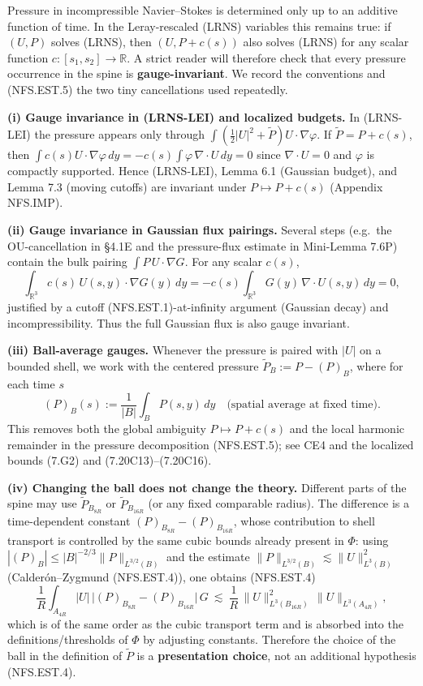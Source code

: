 \documentclass[
  11pt,
]{article}
\begin{document}
Pressure in incompressible Navier--Stokes is determined only up to an additive function of time. In the Leray-rescaled (LRNS) variables this remains true: if \((U,P)\) solves (LRNS), then \((U,P+c(s))\) also solves (LRNS) for any scalar function \(c\colon[s_1,s_2]\to\mathbb R\). A strict reader will therefore check that every pressure occurrence in the spine is \textbf{gauge-invariant}. We record the conventions and (NFS.EST.5) the two tiny cancellations used repeatedly.

\textbf{(i) Gauge invariance in (LRNS-LEI) and localized budgets.} In (LRNS-LEI) the pressure appears only through \(\int (\tfrac12|U|^2+\widetilde P)U\cdot\nabla\varphi\). If \(\widetilde P=P+c(s)\), then \(\int c(s)U\cdot\nabla\varphi\,dy = -c(s)\int \varphi\,\nabla\cdot U\,dy =0\) since \(\nabla\cdot U=0\) and \(\varphi\) is compactly supported. Hence (LRNS-LEI), Lemma 6.1 (Gaussian budget), and Lemma 7.3 (moving cutoffs) are invariant under \(P\mapsto P+c(s)\) (Appendix NFS.IMP).

\textbf{(ii) Gauge invariance in Gaussian flux pairings.} Several steps (e.g.~the OU-cancellation in §4.1E and the pressure-flux estimate in Mini-Lemma 7.6P) contain the bulk pairing \(\int P\,U\cdot\nabla G\). For any scalar \(c(s)\), \[\int_{\mathbb R^3} c(s)\,U(s,y)\cdot\nabla G(y)\,dy = -c(s)\int_{\mathbb R^3} G(y)\,\nabla\cdot U(s,y)\,dy =0,\] justified by a cutoff (NFS.EST.1)-at-infinity argument (Gaussian decay) and incompressibility. Thus the full Gaussian flux is also gauge invariant.

\textbf{(iii) Ball-average gauges.} Whenever the pressure is paired with \(|U|\) on a bounded shell, we work with the centered pressure \(\widetilde P_B:=P-(P)_B\), where for each time \(s\) \[(P)_B(s):=\frac{1}{|B|}\int_B P(s,y)\,dy\quad\text{(spatial average at fixed time).}\] This removes both the global ambiguity \(P\mapsto P+c(s)\) and the local harmonic remainder in the pressure decomposition (NFS.EST.5); see CE4 and the localized bounds (7.G2) and (7.20C13)--(7.20C16).

\textbf{(iv) Changing the ball does not change the theory.} Different parts of the spine may use \(\widetilde P_{B_{8R}}\) or \(\widetilde P_{B_{16R}}\) (or any fixed comparable radius). The difference is a time-dependent constant \((P)_{B_{8R}}-(P)_{B_{16R}}\), whose contribution to shell transport is controlled by the same cubic bounds already present in \(\Phi\): using \(|(P)_B|\le |B|^{-2/3}\|P\|_{L^{3/2}(B)}\) and the estimate \(\|P\|_{L^{3/2}(B)}\lesssim\|U\|_{L^3(B)}^2\) (Calderón--Zygmund (NFS.EST.4)), one obtains (NFS.EST.4) \[\frac1R\int_{A_{4R}} |U|\,\big|(P)_{B_{8R}}-(P)_{B_{16R}}\big|\,G
\ \lesssim\ \frac1R\,\|U\|_{L^3(B_{16R})}^2\,\|U\|_{L^3(A_{4R})},\] which is of the same order as the cubic transport term and is absorbed into the definitions/thresholds of \(\Phi\) by adjusting constants. Therefore the choice of the ball in the definition of \(\widetilde P\) is a \textbf{presentation choice}, not an additional hypothesis (NFS.EST.4).
\end{document}
